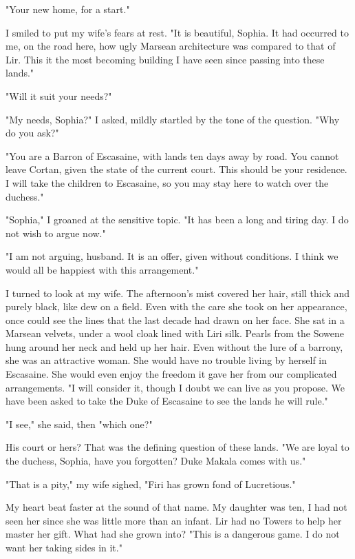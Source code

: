 \documentclass{article}
\begin{document}
"Your new home, for a start." 

I smiled to put my wife's fears at rest. "It is beautiful, Sophia. It had occurred to me, on the road here, how ugly Marsean architecture was compared to that of Lir. This it the most becoming building I have seen since passing into these lands."

"Will it suit your needs?"

"My needs, Sophia?" I asked, mildly startled by the tone of the question. "Why do you ask?"

"You are a Barron of Escasaine, with lands ten days away by road. You cannot leave Cortan, given the state of the current court. This should be your residence. I will take the children to Escasaine, so you may stay here to watch over the duchess."

"Sophia," I groaned at the sensitive topic. "It has been a long and tiring day. I do not wish to argue now."

"I am not arguing, husband. It is an offer, given without conditions. I think we would all be happiest with this arrangement."

I turned to look at my wife. The afternoon's mist covered her hair, still thick and purely black, like dew on a field. Even with the care she took on her appearance, once could see the lines that the last decade had drawn on her face. She sat in a Marsean velvets, under a wool cloak lined with Liri silk. Pearls from the Sowene hung around her neck and held up her hair. Even without the lure of a barrony, she was an attractive woman. She would have no trouble living by herself in Escasaine. She would even enjoy the freedom it gave her from our complicated arrangements. "I will consider it, though I doubt we can live as you propose. We have been asked to take the Duke of Escasaine to see the lands he will rule."

"I see," she said, then "which one?"

His court or hers? That was the defining question of these lands. "We are loyal to the duchess, Sophia, have you forgotten? Duke Makala comes with us."

"That is a pity," my wife sighed, "Firi has grown fond of Lucretious."

My heart beat faster at the sound of that name. My daughter was ten, I had not seen her since she was little more than an infant. Lir had no Towers to help her master her gift. What had she grown into? "This is a dangerous game. I do not want her taking sides in it."
\end{document}
